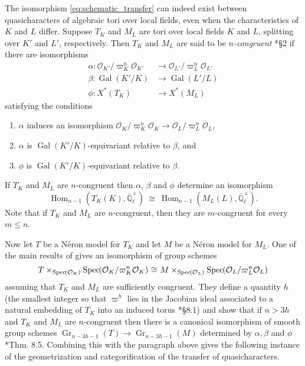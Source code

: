 \documentclass[CM,Submssn,SecEq]{degruyter-crelle} %
\theoremstyle{plain}
\theoremstyle{definition}
\theoremstyle{remark}
\newcommand{\EE}{\mathbb{\bar Q}_\ell}
\newcommand{\OK}{\mathcal{O}_K}
\newcommand{\OL}{\mathcal{O}_L}
\newcommand{\OO}[1]{\mathcal{O}_{#1}}
\newcommand{\EEx}{\EE^\times}
\DeclareMathOperator{\Gal}{Gal}
\DeclareMathOperator{\Hom}{Hom}
\DeclareMathOperator{\Gr}{Gr}
\newcommand{\Spec}[1]{{\operatorname{Spec}\hskip-1pt( #1 )}}
\newcommand{\iso}{{\ \cong\ }}
\begin{document}
The isomorphism \eqref{eq:schematic_transfer} can indeed exist between quasicharacters of algebraic tori over local fields, even when the characteristics of $K$ and $L$ differ.
Suppose $T_K$ and $M_L$ are tori over local fields $K$ and $L$,
splitting over $K'$ and $L'$, respectively.
Then $T_K$ and $M_L$ are said to be \emph{$n$-congruent} \cite{chai-yu:01a}*{\S 2} if there are isomorphisms
 \begin{align*}
  \alpha : \OO{K'}/\varpi_K^n \OO{K'} &\to \OO{L'}/\varpi_{L}^n \OO{L'} \\
  \beta : \Gal(K'/K) &\to \Gal(L'/L) \\
  \phi : X^*(T_K) &\to X^*(M_L)
 \end{align*}
 satisfying the conditions
 \begin{enumerate}
  \item $\alpha$ induces an isomorphism $\OK/\varpi_K^n \OK \to \OO{L}/\varpi_{L}^n \OO{L}$,
  \item $\alpha$ is $\Gal(K'/K)$-equivariant relative to $\beta$, and
  \item $\phi$ is $\Gal(K'/K)$-equivariant relative to $\beta$.
 \end{enumerate}
If $T_K$ and $M_L$ are $n$-congruent then $\alpha$, $\beta$ and $\phi$ determine an isomorphism 
\begin{equation}\label{transfer}
  \Hom_{n-1}(T_K(K), \EEx) \iso \Hom_{n-1}(M_L(L),\EEx).
\end{equation}
Note that if $T_K$ and $M_L$ are $n$-congruent, then they are $m$-congruent for every
$m \leq n$.
%

Now let $T$ be a N\'eron model for $T_K$ and let $M$ be a N\'eron model for $M_L$.
One of the main results of \cite{chai-yu:01a} gives an isomorphism of group schemes 
\[
T \times_{\Spec{\OK}} \Spec{\OK/\varpi_K^n\OK} \iso M \times_{\Spec{\OL}} \Spec{\OL/\varpi_L^n\OL}
\] 
assuming that $T_K$ and $M_L$ are sufficiently congruent.
They define a quantity $h$ (the smallest integer so that $\varpi^h$ lies in the
Jacobian ideal associated to a natural embedding of $T_K$ into an induced torus \cite{chai-yu:01a}*{\S 8.1}) and show  that if $n > 3h$ and $T_K$ and $M_L$ are $n$-congruent then there is a canonical isomorphism of smooth group schemes
 $
\Gr_{n-3h-1}(T) \to \Gr_{n-3h-1}(M)
 $
 determined by $\alpha, \beta$ and $\phi$ \cite{chai-yu:01a}*{Thm. 8.5}.
Combining this with the paragraph above gives the following instance of the geometrization and categorification of the transfer of quasicharacters.
\end{document}
